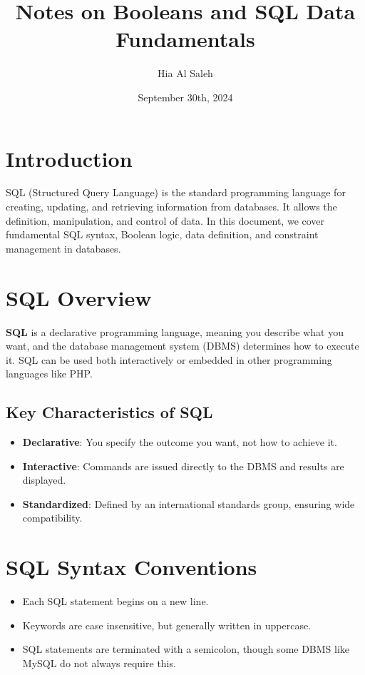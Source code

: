 \documentclass{article}
\begin{document}
\title{Notes on Booleans and SQL Data Fundamentals}
\author{Hia Al Saleh}
\date{September 30th, 2024}
\maketitle
\tableofcontents
\newpage 

\section{Introduction}
SQL (Structured Query Language) is the standard programming language for creating, updating, and retrieving information from databases. It allows the definition, manipulation, and control of data. In this document, we cover fundamental SQL syntax, Boolean logic, data definition, and constraint management in databases.

\section{SQL Overview}
\textbf{SQL} is a declarative programming language, meaning you describe what you want, and the database management system (DBMS) determines how to execute it. SQL can be used both interactively or embedded in other programming languages like PHP.

\subsection{Key Characteristics of SQL}
\begin{itemize}
    \item \textbf{Declarative}: You specify the outcome you want, not how to achieve it.
    \item \textbf{Interactive}: Commands are issued directly to the DBMS and results are displayed.
    \item \textbf{Standardized}: Defined by an international standards group, ensuring wide compatibility.
\end{itemize}

\section{SQL Syntax Conventions}
\begin{itemize}
    \item Each SQL statement begins on a new line.
    \item Keywords are case insensitive, but generally written in uppercase.
    \item SQL statements are terminated with a semicolon, though some DBMS like MySQL do not always require this.
\end{itemize}
\end{document}
